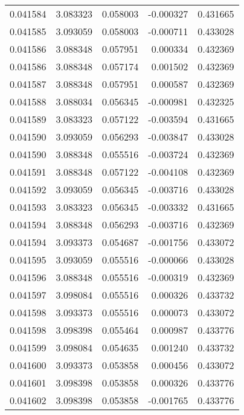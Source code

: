 \begin{tabular}{lrrrr}
0.041584    &  3.083323 &  0.058003 & -0.000327 &             0.431665 \\
0.041585    &  3.093059 &  0.058003 & -0.000711 &             0.433028 \\
0.041586    &  3.088348 &  0.057951 &  0.000334 &             0.432369 \\
0.041586    &  3.088348 &  0.057174 &  0.001502 &             0.432369 \\
0.041587    &  3.088348 &  0.057951 &  0.000587 &             0.432369 \\
0.041588    &  3.088034 &  0.056345 & -0.000981 &             0.432325 \\
0.041589    &  3.083323 &  0.057122 & -0.003594 &             0.431665 \\
0.041590    &  3.093059 &  0.056293 & -0.003847 &             0.433028 \\
0.041590    &  3.088348 &  0.055516 & -0.003724 &             0.432369 \\
0.041591    &  3.088348 &  0.057122 & -0.004108 &             0.432369 \\
0.041592    &  3.093059 &  0.056345 & -0.003716 &             0.433028 \\
0.041593    &  3.083323 &  0.056345 & -0.003332 &             0.431665 \\
0.041594    &  3.088348 &  0.056293 & -0.003716 &             0.432369 \\
0.041594    &  3.093373 &  0.054687 & -0.001756 &             0.433072 \\
0.041595    &  3.093059 &  0.055516 & -0.000066 &             0.433028 \\
0.041596    &  3.088348 &  0.055516 & -0.000319 &             0.432369 \\
0.041597    &  3.098084 &  0.055516 &  0.000326 &             0.433732 \\
0.041598    &  3.093373 &  0.055516 &  0.000073 &             0.433072 \\
0.041598    &  3.098398 &  0.055464 &  0.000987 &             0.433776 \\
0.041599    &  3.098084 &  0.054635 &  0.001240 &             0.433732 \\
0.041600    &  3.093373 &  0.053858 &  0.000456 &             0.433072 \\
0.041601    &  3.098398 &  0.053858 &  0.000326 &             0.433776 \\
0.041602    &  3.098398 &  0.053858 & -0.001765 &             0.433776 \\

\end{tabular}
